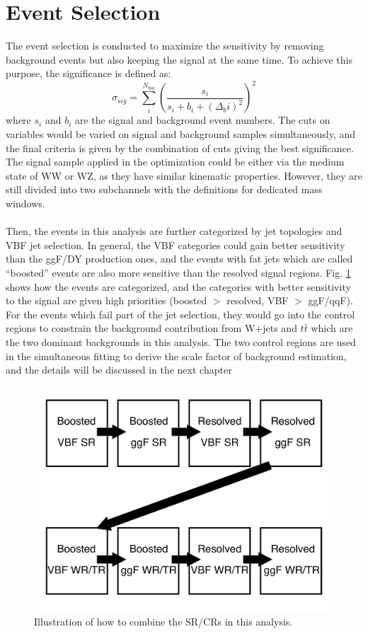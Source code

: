 \section{Event Selection}
The event selection is conducted to maximize the sensitivity by removing background events but also keeping the signal at the same time. To achieve this purpose, the significance is defined as:
\begin{equation}
\label{Eq:significance}
\sigma_{sig} = \displaystyle\sum_{i}^{N_{bin}}( \frac{s_i}{s_i+b_i+(\Delta_bi)^2})^2
\end{equation}
where $s_i$ and $b_i$ are the signal and background event numbers. The cuts on variables would be varied on signal and background samples simultaneously, and the final criteria is given by the combination of cuts giving the best significance. The signal sample applied in the optimization could be either via the medium state of WW or WZ, as they have similar kinematic properties. However, they are still divided into two subchannels with the definitions for dedicated mass windows.  
\\
\\Then, the events in this analysis are further categorized by jet topologies and VBF jet selection. In general, the VBF categories could gain better sensitivity than the ggF/DY production ones, and the events with fat jets which are called ``boosted'' events are also more sensitive than the resolved signal regions. Fig. \ref{Fig:order} shows how the events are categorized, and the categories with better sensitivity to the signal are given high priorities (boosted $>$ resolved, VBF $>$ ggF/qqF). For the events which fail part of the jet selection, they would go into the control regions to constrain the background contribution from W+jets and $t\bar{t}$ which are the two dominant backgrounds in this analysis. The two control regions are used in the simultaneous fitting to derive the scale factor of background estimation, and the details will be discussed in the next chapter
\begin{figure}[h]
	\centering
	\includegraphics[width=0.7\hsize]{Chapter3/order}
	\caption{Illustration of how to combine the SR/CRs in this analysis.}
	\label{Fig:order}
\end{figure}


